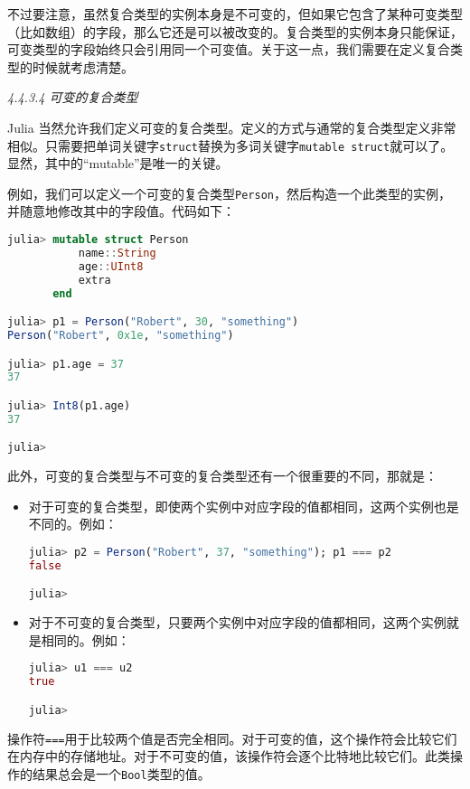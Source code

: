 不过要注意，虽然复合类型的实例本身是不可变的，但如果它包含了某种可变类型（比如数组）的字段，那么它还是可以被改变的。复合类型的实例本身只能保证，可变类型的字段始终只会引用同一个可变值。关于这一点，我们需要在定义复合类型的时候就考虑清楚。

\textsl{4.4.3.4 可变的复合类型}

Julia 当然允许我们定义可变的复合类型。定义的方式与通常的复合类型定义非常相似。只需要把单词关键字\verb`struct`替换为多词关键字\verb`mutable struct`就可以了。显然，其中的“mutable”是唯一的关键。

例如，我们可以定义一个可变的复合类型\verb`Person`，然后构造一个此类型的实例，并随意地修改其中的字段值。代码如下：

\begin{lstlisting}[language=julia]
julia> mutable struct Person
           name::String
           age::UInt8
           extra
       end

julia> p1 = Person("Robert", 30, "something")
Person("Robert", 0x1e, "something")

julia> p1.age = 37
37

julia> Int8(p1.age)
37

julia> 
\end{lstlisting}

此外，可变的复合类型与不可变的复合类型还有一个很重要的不同，那就是：

\begin{itemize}
\item 对于可变的复合类型，即使两个实例中对应字段的值都相同，这两个实例也是不同的。例如：

\begin{lstlisting}[language=julia]
julia> p2 = Person("Robert", 37, "something"); p1 === p2
false

julia> 
\end{lstlisting}

\item 对于不可变的复合类型，只要两个实例中对应字段的值都相同，这两个实例就是相同的。例如：

\begin{lstlisting}[language=julia]
julia> u1 === u2
true

julia> 
\end{lstlisting}

\end{itemize}
操作符\verb`===`用于比较两个值是否完全相同。对于可变的值，这个操作符会比较它们在内存中的存储地址。对于不可变的值，该操作符会逐个比特地比较它们。此类操作的结果总会是一个\verb`Bool`类型的值。

